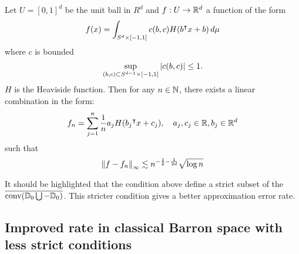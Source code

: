 




\begin{theorem}\cite[Theorem 2, p. 218]{makovozUniformApproximationNeural1998}

    Let $U = [0,1]^d$ be the unit ball in $R^d$ and $f: U \to \mathbb{R}^d$ a function
    of the form
    \begin{equation}
        f(x) = \int_{S^d \times [-1,1]} c(b,c) H(b{}^{\intercal} x + b)\,d\mu
    \end{equation}
    where $c$ is bounded 
    \begin{equation}
        \sup_{(b,c)\subset S^{d-1}\times [-1,1]} \left| c(b,c) \right| \leq 1.
    \end{equation}
    $H$ is the Heaviside function. Then for any $n \in
    \mathbb{N}$, there exists a linear combination in the form:
    \begin{equation}
        \label{eq:fn_Heaviside}
        f_n = \sum_{j=1}^n \frac{1}{n} a_j H(b_j{}^{\intercal} x + c_j), \quad
        a_j,c_j \in\mathbb{R}, b_j \in \mathbb{R}^d
    \end{equation}
    such that
    \begin{equation}
        \left\| f - f_n \right\|_{\infty} \lesssim 
        n^{-\frac{1}{2} - \frac{1}{2d}} \sqrt{\log{n}}
    \end{equation}
\end{theorem}

\begin{remark}
    It should be highlighted that the condition above define a strict subset of
    the $\overline{\operatorname*{conv}({\mathbb{D}_0} \bigcup -{\mathbb{D}_0})}$. This stricter condition gives a
    better approximation error rate.
\end{remark}

\subsection{Improved rate in classical Barron space with less strict conditions}

